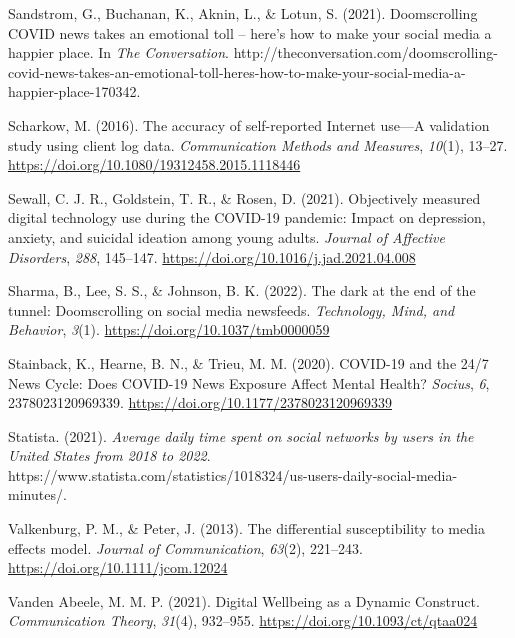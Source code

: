 \documentclass[
  man,mask,floatsintext]{apa7}
\newlength{\cslhangindent}
\newenvironment{CSLReferences}[2] %
 {\begin{list}{}{%
  \setlength{\itemindent}{0pt}
  \setlength{\leftmargin}{0pt}
  \setlength{\parsep}{0pt}
  \ifodd #1
   \setlength{\leftmargin}{\cslhangindent}
   \setlength{\itemindent}{-1\cslhangindent}
  \fi
  \setlength{\itemsep}{#2\baselineskip}}}
 {\end{list}}
\begin{document}
\begin{CSLReferences}{1}{0}
Sandstrom, G., Buchanan, K., Aknin, L., \& Lotun, S. (2021). Doomscrolling {COVID} news takes an emotional toll -- here's how to make your social media a happier place. In \emph{The Conversation}. http://theconversation.com/doomscrolling-covid-news-takes-an-emotional-toll-heres-how-to-make-your-social-media-a-happier-place-170342.

Scharkow, M. (2016). The accuracy of self-reported {Internet} use---{A} validation study using client log data. \emph{Communication Methods and Measures}, \emph{10}(1), 13--27. \url{https://doi.org/10.1080/19312458.2015.1118446}

Sewall, C. J. R., Goldstein, T. R., \& Rosen, D. (2021). Objectively measured digital technology use during the {COVID-19} pandemic: {Impact} on depression, anxiety, and suicidal ideation among young adults. \emph{Journal of Affective Disorders}, \emph{288}, 145--147. \url{https://doi.org/10.1016/j.jad.2021.04.008}

Sharma, B., Lee, S. S., \& Johnson, B. K. (2022). The dark at the end of the tunnel: {Doomscrolling} on social media newsfeeds. \emph{Technology, Mind, and Behavior}, \emph{3}(1). \url{https://doi.org/10.1037/tmb0000059}

Stainback, K., Hearne, B. N., \& Trieu, M. M. (2020). {COVID-19} and the 24/7 {News Cycle}: {Does COVID-19 News Exposure Affect Mental Health}? \emph{Socius}, \emph{6}, 2378023120969339. \url{https://doi.org/10.1177/2378023120969339}

Statista. (2021). \emph{Average daily time spent on social networks by users in the {United States} from 2018 to 2022}. https://www.statista.com/statistics/1018324/us-users-daily-social-media-minutes/.

Valkenburg, P. M., \& Peter, J. (2013). The differential susceptibility to media effects model. \emph{Journal of Communication}, \emph{63}(2), 221--243. \url{https://doi.org/10.1111/jcom.12024}

Vanden Abeele, M. M. P. (2021). Digital {Wellbeing} as a {Dynamic Construct}. \emph{Communication Theory}, \emph{31}(4), 932--955. \url{https://doi.org/10.1093/ct/qtaa024}


\end{CSLReferences}
\end{document}
